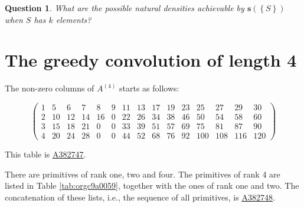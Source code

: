 \documentclass[12pt]{article}
\theoremstyle{definition}
\theoremstyle{remark}
\theoremstyle{plain}
\newtheorem{question}{Question}
\newcommand{\set}[1]{\left\{{#1}\right\}}
\newcommand{\ssift}[1]{\mathbf{s}({#1})}
\newcommand{\seqnum}[1]{\href{https://oeis.org/#1}{\textrm \underline{#1}}}
\begin{document}
\begin{question}
What are the possible natural densities achievable by \(\ssift{\set{S}}\) when \(S\) has
\(k\) elements?
\end{question}
\section{The greedy convolution of length 4}
\label{sec:orgfd29dc1}
The non-zero columns of \(A^{(4)}\) starts as follows:

\begin{displaymath}
\left(\begin{array}{rrrrrrrrrrrrrrr}
1 & 5 & 6 & 7 & 8 & 9 & 11 & 13 & 17 & 19 & 23 & 25 & 27 & 29 & 30 \\
2 & 10 & 12 & 14 & 16 & 0 & 22 & 26 & 34 & 38 & 46 & 50 & 54 & 58 & 60 \\
3 & 15 & 18 & 21 & 0 & 0 & 33 & 39 & 51 & 57 & 69 & 75 & 81 & 87 & 90 \\
4 & 20 & 24 & 28 & 0 & 0 & 44 & 52 & 68 & 76 & 92 & 100 & 108 & 116 & 120
\end{array}\right)
\end{displaymath}

This table is \seqnum{A382747}.

There are primitives of rank one, two and four. The primitives of rank 4 are listed in Table \ref{tab:orgc9a0059},
together with the ones of rank one and two. The concatenation
of these lists, i.e., the sequence of all primitives, is \seqnum{A382748}.
\end{document}
